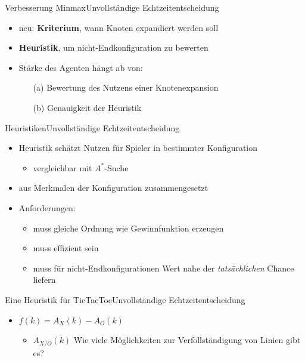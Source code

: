 \documentclass[18pt, aspectratio=169]{beamer}
\newcommand\q[1]{\glqq #1\grqq}
\begin{document}
\begin{frame}{Verbesserung Minmax}{Unvollständige Echtzeitentscheidung}
	\begin{itemize}
	\item
	  neu: \textbf{Kriterium}, wann Knoten expandiert werden soll
	  \pause
	\item
	  \textbf{Heuristik}, um nicht-Endkonfiguration zu bewerten
	  \pause
	\item
	  Stärke des Agenten hängt ab von:
	  \begin{itemize}
	  \item[(a)] Bewertung des Nutzens einer Knotenexpansion
	  \item[(b)] Genauigkeit der Heuristik
		\end{itemize}
	\end{itemize}
\end{frame}

\begin{frame}{Heuristiken}{Unvollständige Echtzeitentscheidung}

\begin{itemize}
\item
  Heuristik schätzt Nutzen für Spieler in bestimmter Konfiguration
  \begin{itemize}
  	\item vergleichbar mit $A^*$-Suche
  \end{itemize}
  \pause
  \item
  aus Merkmalen der Konfiguration zusammengesetzt
	\item
	\pause
  Anforderungen:
  \begin{itemize}
  \item
    muss gleiche Ordnung wie Gewinnfunktion erzeugen
    \pause
  \item
    muss effizient sein
    \pause
  \item
    muss für nicht-Endkonfigurationen Wert nahe der \textit{tatsächlichen} Chance liefern
  \end{itemize}
\end{itemize}
\end{frame}

\begin{frame}{Eine Heuristik für TicTacToe}{Unvollständige Echtzeitentscheidung}
	\begin{itemize}
  	\item $f(k) = A_X(k) - A_O(k)$
  		\begin{itemize}
  			\item $A_{X/O}(k)$ \quad \q{Wie viele Möglichkeiten zur Verfollständigung von Linien gibt es?}
  		\end{itemize}
  \end{itemize}
\end{frame}
\end{document}
